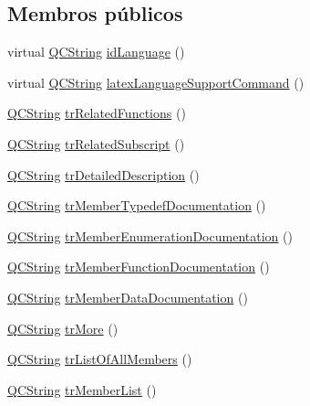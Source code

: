 \subsection*{Membros públicos}
\begin{DoxyCompactItemize}
\item 
virtual \hyperlink{class_q_c_string}{Q\-C\-String} \hyperlink{class_translator_italian_a903bf0b486fd16dfbc84606e8474ff84}{id\-Language} ()
\item 
virtual \hyperlink{class_q_c_string}{Q\-C\-String} \hyperlink{class_translator_italian_a38858830a8a30ed8dd67927882d27ff3}{latex\-Language\-Support\-Command} ()
\item 
\hyperlink{class_q_c_string}{Q\-C\-String} \hyperlink{class_translator_italian_a577fc586e534023ef1529208518a994e}{tr\-Related\-Functions} ()
\item 
\hyperlink{class_q_c_string}{Q\-C\-String} \hyperlink{class_translator_italian_ab75e972b3134554de11b07bd64127b78}{tr\-Related\-Subscript} ()
\item 
\hyperlink{class_q_c_string}{Q\-C\-String} \hyperlink{class_translator_italian_abbd0ae4fd49dd1e88f99e03dd19d4e35}{tr\-Detailed\-Description} ()
\item 
\hyperlink{class_q_c_string}{Q\-C\-String} \hyperlink{class_translator_italian_a95ba3c5f2554643a7dc0f3408c2b493d}{tr\-Member\-Typedef\-Documentation} ()
\item 
\hyperlink{class_q_c_string}{Q\-C\-String} \hyperlink{class_translator_italian_acfa422f286e43d1d5c893475aca1e757}{tr\-Member\-Enumeration\-Documentation} ()
\item 
\hyperlink{class_q_c_string}{Q\-C\-String} \hyperlink{class_translator_italian_aea34608536223538051d2155ff75e05e}{tr\-Member\-Function\-Documentation} ()
\item 
\hyperlink{class_q_c_string}{Q\-C\-String} \hyperlink{class_translator_italian_abf6ac59353bc6c466642f7c1919fc3f2}{tr\-Member\-Data\-Documentation} ()
\item 
\hyperlink{class_q_c_string}{Q\-C\-String} \hyperlink{class_translator_italian_a2487804cd36e9995aaadb94275b58fd7}{tr\-More} ()
\item 
\hyperlink{class_q_c_string}{Q\-C\-String} \hyperlink{class_translator_italian_aa4f141f325a7ec448304389833d483d1}{tr\-List\-Of\-All\-Members} ()
\item 
\hyperlink{class_q_c_string}{Q\-C\-String} \hyperlink{class_translator_italian_a26d915bcb2e7e1e206bc6a18f05a7c66}{tr\-Member\-List} ()
\item 

\end{DoxyCompactItemize}
